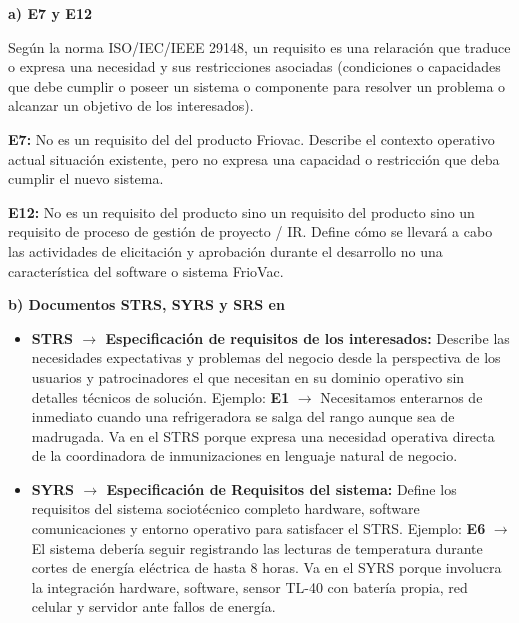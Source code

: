 \documentclass[11pt]{article}
\begin{document}
\begin{cajaclave}[title={Respuesta T1 (Transcripción fiel de las hojas manuscritas)}]

	\textbf{a) E7 y E12}\par

	Según la norma ISO/IEC/IEEE 29148, un requisito es una relaración que traduce o expresa una necesidad y sus restricciones asociadas (condiciones o capacidades que debe cumplir o poseer un sistema o componente para resolver un problema o alcanzar un objetivo de los interesados).\par\smallskip

	\textbf{E7:} No es un requisito del del producto Friovac. Describe el contexto operativo actual situación existente, pero no expresa una capacidad o restricción que deba cumplir el nuevo sistema.\par\smallskip

	\textbf{E12:} No es un requisito del producto sino un requisito del producto sino un requisito de proceso de gestión de proyecto / IR. Define cómo se llevará a cabo las actividades de elicitación y aprobación durante el desarrollo no una característica del software o sistema FrioVac.\par\medskip



	\textbf{b) Documentos STRS, SYRS y SRS en}

	\begin{itemize}[leftmargin=16pt,itemsep=2pt]

		\item \textbf{STRS $\rightarrow$ Especificación de requisitos de los interesados:} Describe las necesidades expectativas y problemas del negocio desde la perspectiva de los usuarios y patrocinadores el que necesitan en su dominio operativo sin detalles técnicos de solución. Ejemplo: \textbf{E1} $\rightarrow$ Necesitamos enterarnos de inmediato cuando una refrigeradora se salga del rango aunque sea de madrugada. Va en el STRS porque expresa una necesidad operativa directa de la coordinadora de inmunizaciones en lenguaje natural de negocio.

		\item \textbf{SYRS $\rightarrow$ Especificación de Requisitos del sistema:} Define los requisitos del sistema sociotécnico completo hardware, software comunicaciones y entorno operativo para satisfacer el STRS. Ejemplo: \textbf{E6} $\rightarrow$ El sistema debería seguir registrando las lecturas de temperatura durante cortes de energía eléctrica de hasta 8 horas. Va en el SYRS porque involucra la integración hardware, software, sensor TL-40 con batería propia, red celular y servidor ante fallos de energía.


\end{itemize}
\end{cajaclave}
\end{document}
